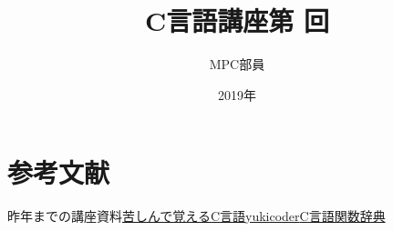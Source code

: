 \documentclass[a4j,titlepage,dvipdfmx]{jsarticle}   %
\title{C言語講座第 回}%
\author{MPC部員}
\date{2019年}%
\newcommand{\articlepath}{./article}
\begin{document}
\maketitle




\section*{参考文献}
\noindent
[1]昨年までの講座資料\newline
[2]\href{http://9cguide.appspot.com}{苦しんで覚えるC言語}\newline
[3]\href{https://yukicoder.me/}{yukicoder}\newline
[4]\href{http://www.c-tipsref.com/reference/string.html}{C言語関数辞典}
\end{document}
